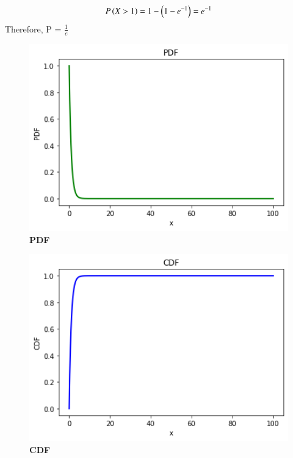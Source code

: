 \documentclass[journal,12pt,twocolumn]{IEEEtran}
\begin{document}
\begin{align}
P\left(X>1\right)=1-\left(1-e^{-1}\right) = e^{-1} \label{Eq:15}
\end{align}
Therefore, P = $\frac{1}{e}$
\newpage
\begin{figure}
\includegraphics[width=15cm]{figure_1.png}
    \caption{\textbf{\huge{PDF}}} 
\end{figure}
\begin{figure}
\includegraphics[width=15cm]{figure_2.png}
    \caption{\textbf{\huge{CDF}}}
\end{figure}
\end{document}
